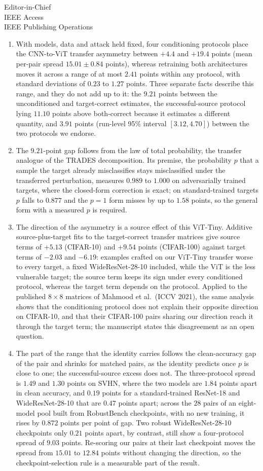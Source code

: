 \documentclass[11pt]{letter}
\begin{document}
\begin{letter}{
Editor-in-Chief\\
IEEE Access\\
IEEE Publishing Operations
}
\begin{enumerate}
    \item With models, data and attack held fixed, four conditioning protocols place the CNN-to-ViT transfer asymmetry between $+4.4$ and $+19.4$ points (mean per-pair spread $15.01 \pm 0.84$ points), whereas retraining both architectures moves it across a range of at most $2.41$ points within any protocol, with standard deviations of $0.23$ to $1.27$ points. Three separate facts describe this range, and they do not add up to it: the $9.21$ points between the unconditioned and target-correct estimates, the successful-source protocol lying $11.10$ points above both-correct because it estimates a different quantity, and $3.91$ points (run-level 95\% interval $[3.12, 4.70]$) between the two protocols we endorse.
    \item The $9.21$-point gap follows from the law of total probability, the transfer analogue of the TRADES decomposition. Its premise, the probability $p$ that a sample the target already misclassifies stays misclassified under the transferred perturbation, measures $0.989$ to $1.000$ on adversarially trained targets, where the closed-form correction is exact; on standard-trained targets $p$ falls to $0.877$ and the $p=1$ form misses by up to $1.58$ points, so the general form with a measured $p$ is required.
    \item The direction of the asymmetry is a source effect of this ViT-Tiny. Additive source-plus-target fits to the target-correct transfer matrices give source terms of $+5.13$ (CIFAR-10) and $+9.54$ points (CIFAR-100) against target terms of $-2.03$ and $-6.19$: examples crafted on our ViT-Tiny transfer worse to every target, a fixed WideResNet-28-10 included, while the ViT is the less vulnerable target; the source term keeps its sign under every conditioned protocol, whereas the target term depends on the protocol. Applied to the published $8\times8$ matrices of Mahmood et al.\ (ICCV 2021), the same analysis shows that the conditioning protocol does not explain their opposite direction on CIFAR-10, and that their CIFAR-100 pairs sharing our direction reach it through the target term; the manuscript states this disagreement as an open question.
    \item The part of the range that the identity carries follows the clean-accuracy gap of the pair and shrinks for matched pairs, as the identity predicts once $p$ is close to one; the successful-source excess does not. The three-protocol spread is $1.49$ and $1.30$ points on SVHN, where the two models are $1.84$ points apart in clean accuracy, and $0.19$ points for a standard-trained ResNet-18 and WideResNet-28-10 that are $0.47$ points apart; across the $28$ pairs of an eight-model pool built from RobustBench checkpoints, with no new training, it rises by $0.872$ points per point of gap. Two robust WideResNet-28-10 checkpoints only $0.21$ points apart, by contrast, still show a four-protocol spread of $9.03$ points. Re-scoring our pairs at their last checkpoint moves the spread from $15.01$ to $12.84$ points without changing the direction, so the checkpoint-selection rule is a measurable part of the result.

\end{enumerate}
\end{letter}
\end{document}
